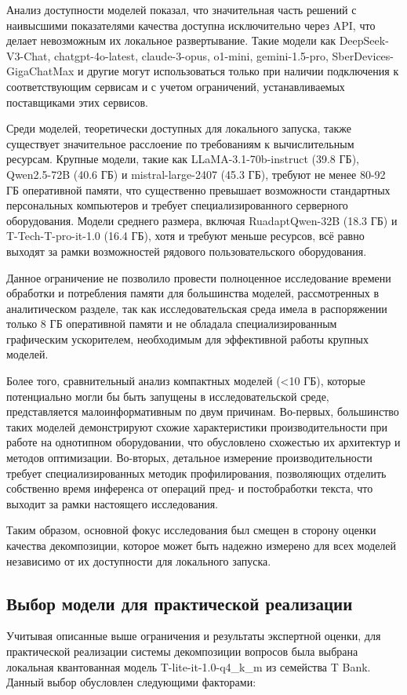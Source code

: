Анализ доступности моделей показал, что значительная часть решений с наивысшими показателями качества доступна исключительно через API, что делает невозможным их локальное развертывание. Такие модели как DeepSeek-V3-Chat, chatgpt-4o-latest, claude-3-opus, o1-mini, gemini-1.5-pro, SberDevices-GigaChatMax и другие могут использоваться только при наличии подключения к соответствующим сервисам и с учетом ограничений, устанавливаемых поставщиками этих сервисов.

Среди моделей, теоретически доступных для локального запуска, также существует значительное расслоение по требованиям к вычислительным ресурсам. Крупные модели, такие как LLaMA-3.1-70b-instruct (39.8 ГБ), Qwen2.5-72B (40.6 ГБ) и mistral-large-2407 (45.3 ГБ), требуют не менее 80-92 ГБ оперативной памяти, что существенно превышает возможности стандартных персональных компьютеров и требует специализированного серверного оборудования. Модели среднего размера, включая RuadaptQwen-32B (18.3 ГБ) и T-Tech-T-pro-it-1.0 (16.4 ГБ), хотя и требуют меньше ресурсов, всё равно выходят за рамки возможностей рядового пользовательского оборудования.

Данное ограничение не позволило провести полноценное исследование времени обработки и потребления памяти для большинства моделей, рассмотренных в аналитическом разделе, так как исследовательская среда имела в распоряжении только 8 ГБ оперативной памяти и не обладала специализированным графическим ускорителем, необходимым для эффективной работы крупных моделей.

Более того, сравнительный анализ компактных моделей (<10 ГБ), которые потенциально могли бы быть запущены в исследовательской среде, представляется малоинформативным по двум причинам. Во-первых, большинство таких моделей демонстрируют схожие характеристики производительности при работе на однотипном оборудовании, что обусловлено схожестью их архитектур и методов оптимизации. Во-вторых, детальное измерение производительности требует специализированных методик профилирования, позволяющих отделить собственно время инференса от операций пред- и постобработки текста, что выходит за рамки настоящего исследования.

Таким образом, основной фокус исследования был смещен в сторону оценки качества декомпозиции, которое может быть надежно измерено для всех моделей независимо от их доступности для локального запуска.

\subsection{Выбор модели для практической реализации}
Учитывая описанные выше ограничения и результаты экспертной оценки, для практической реализации системы декомпозиции вопросов была выбрана локальная квантованная модель T-lite-it-1.0-q4\_k\_m из семейства T Bank. Данный выбор обусловлен следующими факторами:

